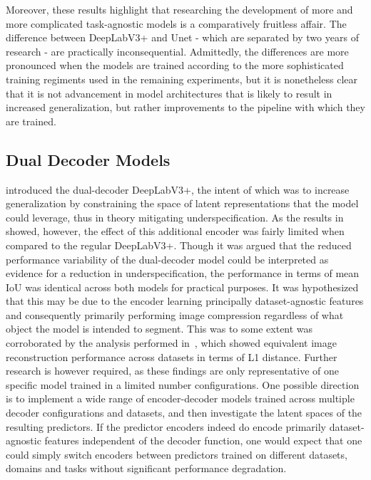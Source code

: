 Moreover, these results highlight that researching the development of more and more complicated task-agnostic models is a comparatively fruitless affair. The difference between DeepLabV3+ and Unet - which are separated by two years of research - are practically inconsequential. Admittedly, the differences are more pronounced when the models are trained according to the more sophisticated training regiments used in the remaining experiments, but it is nonetheless clear that it is not advancement in model architectures that is likely to result in increased generalization, but rather improvements to the pipeline with which they are trained.

\subsection{Dual Decoder Models}
 introduced the dual-decoder DeepLabV3+, the intent of which was to increase generalization by constraining the space of latent representations that the model could leverage, thus in theory mitigating underspecification. As the results in~ showed, however, the effect of this additional encoder was fairly limited when compared to the regular DeepLabV3+. Though it was argued that the reduced performance variability of the dual-decoder model could be interpreted as evidence for a reduction in underspecification, the performance in terms of mean IoU was identical across both models for practical purposes. It was hypothesized that this may be due to the encoder learning principally dataset-agnostic features and consequently primarily performing image compression regardless of what object the model is intended to segment. This was to some extent was corroborated by the analysis performed in~, which showed equivalent image reconstruction performance across datasets in terms of L1 distance. Further research is however required, as these findings are only representative of one specific model trained in a limited number configurations. One possible direction is to implement a wide range of encoder-decoder models trained across multiple decoder configurations and datasets, and then investigate the latent spaces of the resulting predictors. If the predictor encoders indeed do encode primarily dataset-agnostic features independent of the decoder function, one would expect that one could simply switch encoders between predictors trained on different datasets, domains and tasks without significant performance degradation. 

